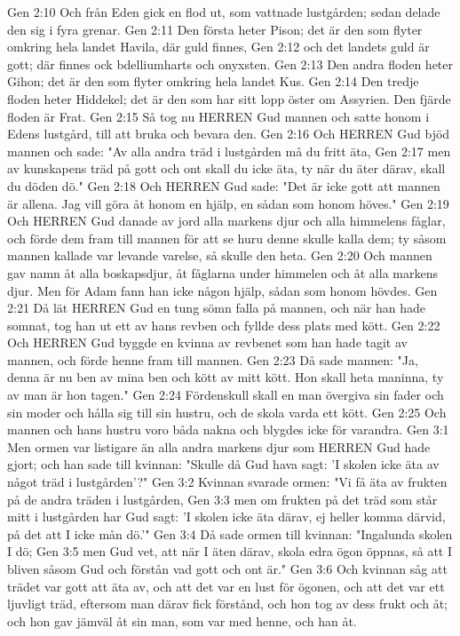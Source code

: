 Gen 2:10  Och från Eden gick en flod ut, som vattnade lustgården; sedan delade den sig i fyra grenar.
Gen 2:11  Den första heter Pison; det är den som flyter omkring hela landet Havila, där guld finnes,
Gen 2:12  och det landets guld är gott; där finnes ock bdelliumharts och onyxsten.
Gen 2:13  Den andra floden heter Gihon; det är den som flyter omkring hela landet Kus.
Gen 2:14  Den tredje floden heter Hiddekel; det är den som har sitt lopp öster om Assyrien. Den fjärde floden är Frat.
Gen 2:15  Så tog nu HERREN Gud mannen och satte honom i Edens lustgård, till att bruka och bevara den.
Gen 2:16  Och HERREN Gud bjöd mannen och sade: "Av alla andra träd i lustgården må du fritt äta,
Gen 2:17  men av kunskapens träd på gott och ont skall du icke äta, ty när du äter därav, skall du döden dö."
Gen 2:18  Och HERREN Gud sade: "Det är icke gott att mannen är allena. Jag vill göra åt honom en hjälp, en sådan som honom höves."
Gen 2:19  Och HERREN Gud danade av jord alla markens djur och alla himmelens fåglar, och förde dem fram till mannen för att se huru denne skulle kalla dem; ty såsom mannen kallade var levande varelse, så skulle den heta.
Gen 2:20  Och mannen gav namn åt alla boskapsdjur, åt fåglarna under himmelen och åt alla markens djur. Men för Adam fann han icke någon hjälp, sådan som honom hövdes.
Gen 2:21  Då lät HERREN Gud en tung sömn falla på mannen, och när han hade somnat, tog han ut ett av hans revben och fyllde dess plats med kött.
Gen 2:22  Och HERREN Gud byggde en kvinna av revbenet som han hade tagit av mannen, och förde henne fram till mannen.
Gen 2:23  Då sade mannen: "Ja, denna är nu ben av mina ben och kött av mitt kött. Hon skall heta maninna, ty av man är hon tagen."
Gen 2:24  Fördenskull skall en man övergiva sin fader och sin moder och hålla sig till sin hustru, och de skola varda ett kött.
Gen 2:25  Och mannen och hans hustru voro båda nakna och blygdes icke för varandra.
Gen 3:1  Men ormen var listigare än alla andra markens djur som HERREN Gud hade gjort; och han sade till kvinnan: "Skulle då Gud hava sagt: 'I skolen icke äta av något träd i lustgården'?"
Gen 3:2  Kvinnan svarade ormen: "Vi få äta av frukten på de andra träden i lustgården,
Gen 3:3  men om frukten på det träd som står mitt i lustgården har Gud sagt: 'I skolen icke äta därav, ej heller komma därvid, på det att I icke mån dö.'"
Gen 3:4  Då sade ormen till kvinnan: "Ingalunda skolen I dö;
Gen 3:5  men Gud vet, att när I äten därav, skola edra ögon öppnas, så att I bliven såsom Gud och förstån vad gott och ont är."
Gen 3:6  Och kvinnan såg att trädet var gott att äta av, och att det var en lust för ögonen, och att det var ett ljuvligt träd, eftersom man därav fick förstånd, och hon tog av dess frukt och åt; och hon gav jämväl åt sin man, som var med henne, och han åt.
